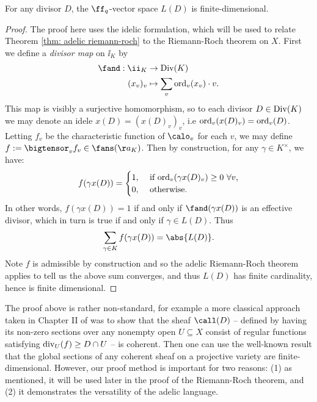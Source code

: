 \documentclass[11pt, x11names, openany]{book}
\begin{document}
\begin{prop}
\label{prop: L(D) is fin-dim}
For any divisor $D$, the $\ff_q$-vector space $L(D)$ is finite-dimensional.
\end{prop}
\begin{proof}
The proof here uses the idelic formulation, which will be used to relate Theorem \ref{thm: adelic riemann-roch} to the Riemann-Roch theorem on $X$. First we define a \textit{divisor map} on $\ii_K$ by
\begin{align}
    \label{eqn: divisor map on ideles}
    \fand : \ii_K &\to \bigdiv(K) \nonumber \\
    (x_v)_v &\mapsto \sum_v \ord_v(x_v) \cdot v.
\end{align}
This map is visibly a surjective homomorphism, so to each divisor $D \in \operatorname{Div}(K)$ we may denote an idele $x(D) = (x(D)_v)_v$, i.e $\operatorname{ord}_v(x(D)_v) = \operatorname{ord}_v(D)$. Letting $f_v$ be the characteristic function of $\calo_v$ for each $v$, we may define $ f := \bigtensor_v f_v \in \fans(\aa_K)$. Then by construction, for any $\gamma \in K^\times$, we have:
\begin{equation*}
    f(\gamma x(D)) = \begin{cases}
    1, & \text{ if $\operatorname{ord}_v(\gamma x(D)_v) \geq 0 \ \forall v$,}\\
    0, & \text{ otherwise}.
    \end{cases}
\end{equation*}
In other words, $f(\gamma x(D)) = 1$ if and only if $\fand(\gamma x(D))$ is an effective divisor, which in turn is true if and only if $\gamma \in L(D)$. Thus
\begin{equation*}
    \sum_{\gamma \in K} f(\gamma x(D)) = \abs{L(D)}.
\end{equation*}
Note $f$ is admissible by construction and so the adelic Riemann-Roch theorem applies to tell us the above sum converges, and thus $L(D)$ has finite cardinality, hence is finite dimensional.
\end{proof}  

\begin{remark}
The proof above is rather non-standard, for example a more classical approach taken in Chapter II of \cite{serre2012algebraic} was to show that the sheaf $\call(D)$ -- defined by having its non-zero sections over any nonempty open $U \subseteq X$ consist of regular functions satisfying $\operatorname{div}_U(f) \geq D \cap U$ -- is coherent. Then one can use the well-known result that the global sections of any coherent sheaf on a projective variety are finite-dimensional. However, our proof method is important for two reasons: (1) as mentioned, it will be used later in the proof of the Riemann-Roch theorem, and (2) it demonstrates the versatility of the adelic language. 
\end{remark}
\end{document}
